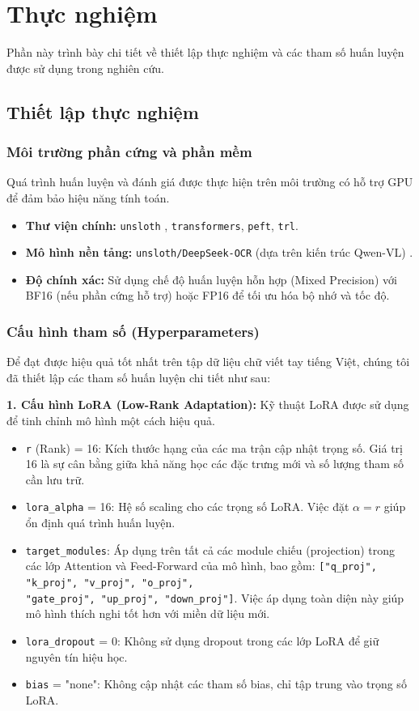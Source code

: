 \section{Thực nghiệm}

Phần này trình bày chi tiết về thiết lập thực nghiệm và các tham số huấn luyện được sử dụng trong nghiên cứu.

\subsection{Thiết lập thực nghiệm}

\subsubsection{Môi trường phần cứng và phần mềm}
Quá trình huấn luyện và đánh giá được thực hiện trên môi trường có hỗ trợ GPU để đảm bảo hiệu năng tính toán.
\begin{itemize}
    \item \textbf{Thư viện chính:} \texttt{unsloth} \cite{unsloth_library}, \texttt{transformers}, \texttt{peft}, \texttt{trl}.
    \item \textbf{Mô hình nền tảng:} \texttt{unsloth/DeepSeek-OCR} (dựa trên kiến trúc Qwen-VL) \cite{unsloth2025deepseek}.
    \item \textbf{Độ chính xác:} Sử dụng chế độ huấn luyện hỗn hợp (Mixed Precision) với BF16 (nếu phần cứng hỗ trợ) hoặc FP16 để tối ưu hóa bộ nhớ và tốc độ.
\end{itemize}

\subsubsection{Cấu hình tham số (Hyperparameters)}

Để đạt được hiệu quả tốt nhất trên tập dữ liệu chữ viết tay tiếng Việt, chúng tôi đã thiết lập các tham số huấn luyện chi tiết như sau:

\textbf{1. Cấu hình LoRA (Low-Rank Adaptation):}
Kỹ thuật LoRA được sử dụng để tinh chỉnh mô hình một cách hiệu quả.
\begin{itemize}
    \item \texttt{r} (Rank) = 16: Kích thước hạng của các ma trận cập nhật trọng số. Giá trị 16 là sự cân bằng giữa khả năng học các đặc trưng mới và số lượng tham số cần lưu trữ.
    \item \texttt{lora\_alpha} = 16: Hệ số scaling cho các trọng số LoRA. Việc đặt $\alpha = r$ giúp ổn định quá trình huấn luyện.
    \item \texttt{target\_modules}: Áp dụng trên tất cả các module chiếu (projection) trong các lớp Attention và Feed-Forward của mô hình, bao gồm: \texttt{["q\_proj", "k\_proj", "v\_proj", "o\_proj", \\ "gate\_proj", "up\_proj", "down\_proj"]}. Việc áp dụng toàn diện này giúp mô hình thích nghi tốt hơn với miền dữ liệu mới.
    \item \texttt{lora\_dropout} = 0: Không sử dụng dropout trong các lớp LoRA để giữ nguyên tín hiệu học.
    \item \texttt{bias} = "none": Không cập nhật các tham số bias, chỉ tập trung vào trọng số LoRA.
\end{itemize}


